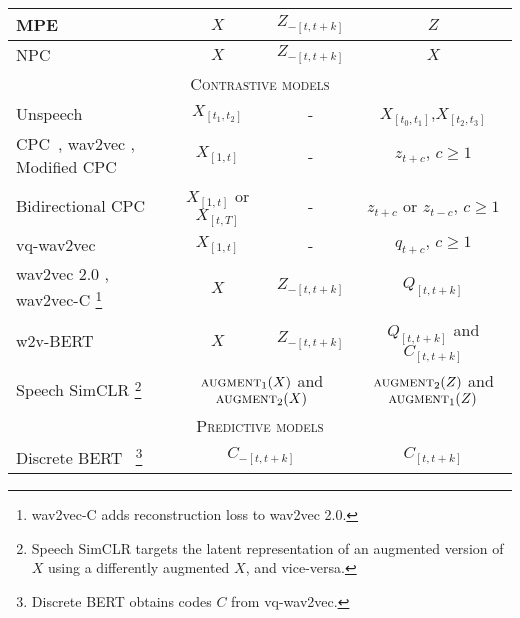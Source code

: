 \begin{table*}[!htb]
{\begin{tabular}{l|c|c|c}
    \midrule 
    MPE~\cite{liu2020masked} & $X$ &  $Z_{-[t,t+k]}$  & $Z$    \\ %
    \midrule
    NPC~\cite{liu21l_interspeech}      & $X$  &   $Z_{-[t,t+k]}$  &    $X$   \\ %
    \midrule
    \midrule
    \multicolumn{4}{c}{\textsc{Contrastive models}} \\
    \midrule
    \midrule
    Unspeech \cite{milde2018unspeech}       &   $X_{[t_1,t_2]}$ &   \textsc{-}   &  $X_{[t_0,t_1]}$,$X_{[t_2,t_3]}$ \\
    \midrule 
    CPC~\cite{oord_representation_2018}, wav2vec \cite{schneider_wav2vec:_2019}, Modified CPC \cite{riviere2020unsupervised}         & $X_{[1,t]}$   &    \textsc{-}           & $z_{t+c},\, c\geq1$   \\ %
    \midrule 
    Bidirectional CPC \cite{kawakami2020learning}      & $X_{[1,t]}$ or $X_{[t,T]}$ &  \textsc{-}    &    $z_{t+c}$ or $z_{t-c},\, c\geq1$   \\
    \midrule 
    vq-wav2vec \cite{baevski_vq-wav2vec_2020}     &   $X_{[1,t]}$ &   \textsc{-}    &   $q_{t+c},\, c\geq1$   \\ 
    \midrule 
    wav2vec 2.0 \cite{baevski2020wav2vec}, wav2vec-C \cite{sadhu_wav2vec-c_2021}\footnote{wav2vec-C adds reconstruction loss to wav2vec 2.0.}    & $X$             & $Z_{-[t,t+k]}$          & $Q_{[t,t+k]}$ \\
    \midrule 
    w2v-BERT \cite{chung_w2vbert_2021}     &$X$ &    $Z_{-[t,t+k]}$   &     $Q_{[t,t+k]}$ and $C_{[t,t+k]}$     \\
    \midrule
    Speech SimCLR \cite{SpeechSimCLR}\footnote{Speech SimCLR targets the latent representation of an augmented version of $X$ using a differently augmented $X$, and vice-versa.}    & \multicolumn{2}{c|}{$\textsc{augment}_1(X)$ and $\textsc{augment}_2(X)$}     &    $\textsc{augment}_2(Z)$ and $\textsc{augment}_1(Z)$   \\ 
    \midrule
    \midrule 
    \multicolumn{4}{c}{\textsc{Predictive models}} \\
    \midrule
    \midrule
    Discrete BERT~\cite{baevski_vq-wav2vec_2020,baevski_effectiveness_2020} \footnote{Discrete BERT obtains codes $C$ from vq-wav2vec.}      &   \multicolumn{2}{c|}{$C_{-[t,t+k]}$}   & $C_{[t,t+k]}$  \\
    \midrule 

\end{tabular}}
\end{table*}

